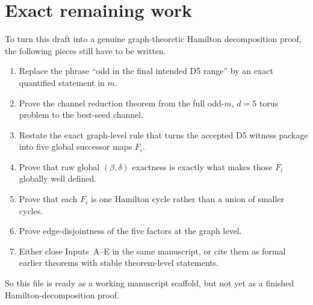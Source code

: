\documentclass[11pt]{article}
\begin{document}
\section{Exact remaining work}

To turn this draft into a genuine graph-theoretic Hamilton decomposition proof,
the following pieces still have to be written.
\begin{enumerate}[label=\textup{(\arabic*)},leftmargin=2.5em]
\item Replace the phrase ``odd in the final intended D5 range'' by an exact
      quantified statement in $m$.
\item Prove the channel reduction theorem from the full odd-$m$, $d=5$ torus
      problem to the best-seed channel.
\item Restate the exact graph-level rule that turns the accepted D5 witness
      package into five global successor maps $F_i$.
\item Prove that raw global $(\beta,\delta)$ exactness is exactly what makes
      those $F_i$ globally well defined.
\item Prove that each $F_i$ is one Hamilton cycle rather than a union of
      smaller cycles.
\item Prove edge-disjointness of the five factors at the graph level.
\item Either close Inputs~A--E in the same manuscript, or cite them as formal
      earlier theorems with stable theorem-level statements.
\end{enumerate}

So this file is ready as a working manuscript scaffold, but not yet as a
finished Hamilton-decomposition proof.
\end{document}

